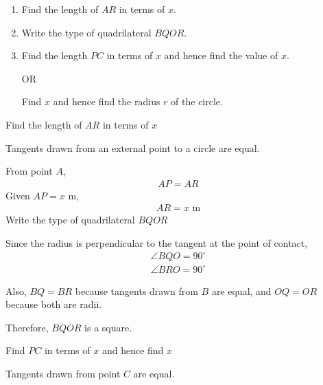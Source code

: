 \begin{enumerate}[label=\thesubsection.\arabic*, ref=\thesubsection.\theenumi]
\begin{enumerate}
    \item[\brak{i}] Find the length of \(AR\) in terms of \(x\).
    \item[\brak{ii}] Write the type of quadrilateral \(BQOR\).
    \item[\brak{iii}]  Find the length \(PC\) in terms of \(x\) and hence find the value of \(x\).

    OR

     Find \(x\) and hence find the radius \(r\) of the circle.
\end{enumerate}

\solution

 Find the length of \(AR\) in terms of \(x\)

Tangents drawn from an external point to a circle are equal.

From point \(A\),
\begin{align}
AP=AR
\end{align}
Given \(AP=x\text{ m}\),
\begin{align}
AR=x\text{ m} \label{eq:EE26BTECH11211_Prob_40.1.10}
\end{align}
 Write the type of quadrilateral \(BQOR\)

Since the radius is perpendicular to the tangent at the point of contact,
\begin{align}
\angle BQO=90^\circ
\end{align}
\begin{align}
\angle BRO=90^\circ
\end{align}

Also, \(BQ=BR\) because tangents drawn from \(B\) are equal, and \(OQ=OR\) because both are radii.

Therefore, \(BQOR\) is a square.

  Find \(PC\) in terms of \(x\) and hence find \(x\)

Tangents drawn from point \(C\) are equal.


\end{enumerate}
